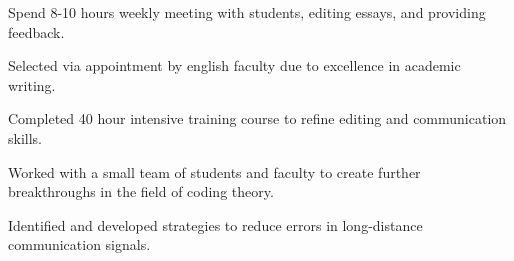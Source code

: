 \documentclass{resume}
\begin{document}
\begin{minipage}[t]{0.66\textwidth}
\begin{tightemize}
\item Spend 8-10 hours weekly meeting with students, editing essays, and providing feedback. 
\item Selected via appointment by english faculty due to excellence in academic writing.
\item Completed 40 hour intensive training course to refine editing  and communication skills.
\end{tightemize}
\sectionsep
\sectionsep


\begin{tightemize}
\item Worked with a small team of students and faculty to create further breakthroughs in the field of coding theory.
\item Identified and developed strategies to reduce errors in long-distance communication signals.
\end{tightemize}
\sectionsep
\sectionsep





\end{minipage}
\end{document}
